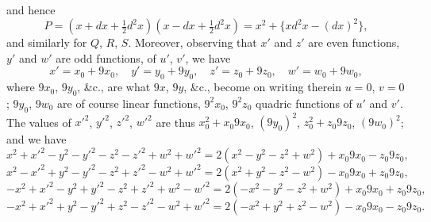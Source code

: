 \documentclass[12pt]{article}
\theoremstyle{plain}
\begin{document}
\newpage
\setcounter{page}{558}

\noindent
and hence
\[
P = (x + dx + \tfrac12 d^2x)(x - dx + \tfrac12 d^2x) = x^2 + \{xd^2x - (dx)^2\},
\]
and similarly for $Q$, $R$, $S$. Moreover, observing that $x'$ and $z'$ are even functions, $y'$ and $w'$ are odd functions, of $u'$, $v'$, we have
\[
x' = x_0 + 9x_0,\quad y' = y_0 + 9y_0,\quad z' = z_0 + 9z_0,\quad w' = w_0 + 9w_0,
\]
where $9x_0$, $9y_0$, \&c., are what $9x$, $9y$, \&c., become on writing therein $u=0$, $v=0$; $9y_0$, $9w_0$ are of course linear functions, $9^2x_0$, $9^2z_0$ quadric functions of $u'$ and $v'$. The values of $x'^2$, $y'^2$, $z'^2$, $w'^2$ are thus $x_0^2 + x_0 9x_0$, $(9y_0)^2$, $z_0^2 + z_0 9z_0$, $(9w_0)^2$; and we have
\[
x^2 + x'^2 - y^2 - y'^2 - z^2 - z'^2 + w^2 + w'^2 = 2(x^2 - y^2 - z^2 + w^2) + x_0 9x_0 - z_0 9z_0,
\]
\[
x^2 - x'^2 + y^2 - y'^2 - z^2 + z'^2 - w^2 + w'^2 = 2(x^2 + y^2 - z^2 - w^2) - x_0 9x_0 + z_0 9z_0,
\]
\[
-x^2 + x'^2 - y^2 + y'^2 - z^2 + z'^2 + w^2 - w'^2 = 2(-x^2 - y^2 - z^2 + w^2) + x_0 9x_0 + z_0 9z_0,
\]
\[
-x^2 + x'^2 + y^2 - y'^2 + z^2 - z'^2 - w^2 + w'^2 = 2(-x^2 + y^2 + z^2 - w^2) - x_0 9x_0 - z_0 9z_0.
\]

\newpage
\setcounter{page}{559}
\end{document}
